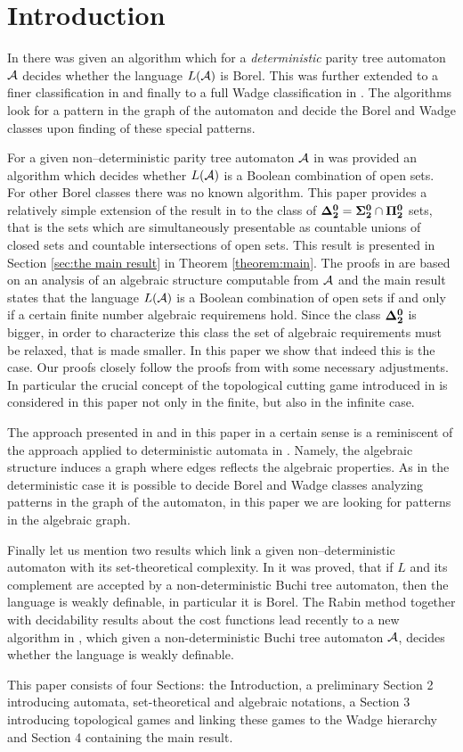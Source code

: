 \section{Introduction}
In \cite{niwalu} there was given an algorithm which for a \emph{deterministic} parity tree automaton ${\mathcal A}$ decides whether the language $L({\mathcal A})$ is Borel. This was further extended to a finer classification in \cite{niwalu2} and finally to a full Wadge classification in \cite{murlak}. The algorithms look for a pattern in the graph of the automaton and decide the Borel and Wadge classes upon finding of these special patterns. 

For a given non--deterministic parity tree automaton ${\mathcal A}$ in \cite{bp} was provided an algorithm which decides
whether $L({\mathcal A})$ is a Boolean combination of open sets. For other Borel classes there was no known algorithm. This paper provides a relatively simple extension 
of the result in \cite{bp} to the class of ${\bf \Delta^0_2} = {\bf\Sigma^0_2}\cap{\bf\Pi^0_2}$ sets, that is the sets which are simultaneously presentable as countable unions of closed sets and countable intersections of open sets. This result is presented in Section \ref{sec:the main result} in Theorem \ref{theorem:main}. The proofs in \cite{bp} are based on an analysis of an algebraic structure computable from ${\mathcal A}$ and the main result states that the language $L({\mathcal A})$ is a Boolean combination of open sets if and only if a certain finite number algebraic requiremens hold. Since the class ${\bf \Delta^0_2}$ is bigger, in order to characterize this class the set of algebraic requirements must be relaxed, that is made smaller. In this paper we show that indeed this is the case. Our proofs closely follow the proofs from \cite{bp} with some necessary adjustments. In particular the crucial concept of the topological cutting game introduced in \cite{bp} is considered in this paper not only in the finite, but also in the infinite case. 

The approach presented in \cite{bp} and in this paper in a certain sense is a reminiscent of the approach applied to deterministic automata in \cite{niwalu,niwalu2,murlak}. Namely, the algebraic structure induces a graph where edges reflects the algebraic properties. As in the deterministic case it is possible to decide Borel and Wadge classes analyzing patterns in the graph of the automaton, in this paper we are looking for patterns in the algebraic graph. 

Finally let us mention two results which link a given non--deterministic automaton with its set-theoretical complexity. In \cite{rabin} it was proved, that if $L$ and its complement are accepted by a non-deterministic Buchi tree automaton, then the language is weakly definable, in particular it is Borel. The Rabin method together with decidability results about the cost functions lead recently to a new algorithm in \cite{cklvb}, which given a non-deterministic Buchi tree automaton ${\mathcal A}$, decides whether the language is weakly definable. 

This paper consists of four Sections: the Introduction, a preliminary Section 2 introducing automata, set-theoretical and algebraic notations, a Section 3 introducing topological games and linking these games to the Wadge hierarchy and Section 4 containing the main result.
